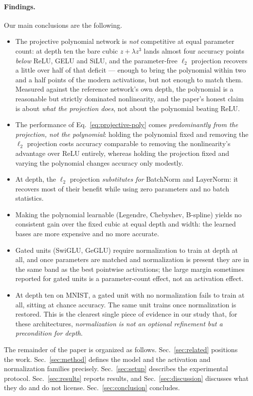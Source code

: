 \paragraph{Findings.}
Our main conclusions are the following.
\begin{itemize}
\item The projective polynomial network is \emph{not} competitive at equal
  parameter count: at depth ten the bare cubic $z + \lambda z^{3}$ lands almost
  four accuracy points \emph{below} ReLU, GELU and SiLU, and the parameter-free
  $\ell_2$ projection recovers a little over half of that deficit --- enough to
  bring the polynomial within two and a half points of the modern activations,
  but not enough to match them. Measured against the reference network's own
  depth, the polynomial is a reasonable but strictly dominated nonlinearity, and
  the paper's honest claim is about \emph{what the projection does}, not about
  the polynomial beating ReLU.
\item The performance of Eq.~\eqref{eq:projective-poly} comes
  \emph{predominantly from the projection, not the polynomial}:
  holding the polynomial fixed and removing the $\ell_2$ projection costs
  accuracy comparable to removing the nonlinearity's advantage over ReLU
  entirely, whereas holding the projection fixed and varying the polynomial
  changes accuracy only modestly.
\item At depth, the $\ell_2$ projection \emph{substitutes for} BatchNorm and
  LayerNorm: it recovers most of their benefit while using zero parameters and
  no batch statistics.
\item Making the polynomial learnable (Legendre, Chebyshev, B-spline) yields
  no consistent gain over the fixed cubic at equal depth and width: the
  learned bases are more expensive and no more accurate.
\item Gated units (SwiGLU, GeGLU) require normalization to train at depth at
  all, and once parameters are matched and normalization is present they are
  in the same band as the best pointwise activations; the large margin
  sometimes reported for gated units is a parameter-count effect, not an
  activation effect.
\item At depth ten on MNIST, a gated unit with no normalization fails to train
  at all, sitting at chance accuracy. The same unit trains once normalization
  is restored. This is the clearest single piece of evidence in our study
  that, for these architectures, \emph{normalization is not an optional
  refinement but a precondition for depth}.
\end{itemize}

The remainder of the paper is organized as follows.
Sec.~\ref{sec:related} positions the work. Sec.~\ref{sec:method} defines the
model and the activation and normalization families precisely.
Sec.~\ref{sec:setup} describes the experimental protocol.
Sec.~\ref{sec:results} reports results, and Sec.~\ref{sec:discussion}
discusses what they do and do not license. Sec.~\ref{sec:conclusion}
concludes.
